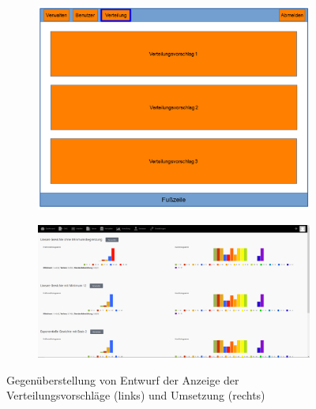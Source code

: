         \begin{figure}
            \centering
            \begin{subfigure}{0.49\textwidth}
                \includegraphics[width=1.0\textwidth]{./implementation/images/MockUpsBackend/backendDistribution.png}
            \end{subfigure}
            \begin{subfigure}{0.49\textwidth}
                \includegraphics[width=1.0\textwidth]{./implementation/images/distribution.png}
            \end{subfigure}
            \caption{Gegenüberstellung von Entwurf der Anzeige der Verteilungsvorschläge (links) und Umsetzung (rechts)}
            \label{fig:comparisonDistribution}
        \end{figure}